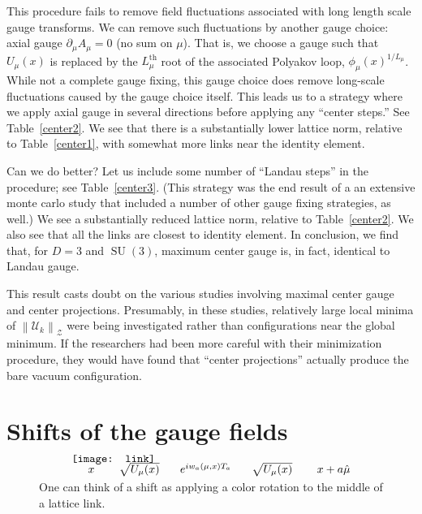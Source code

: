 \documentclass[preprint,aps,prd]{revtex4-2}
\newcommand{\zentrum}{\mathcal{Z}}       %
\newcommand{\config}{\mathcal{U}}
\DeclareMathOperator{\SU}{SU}
\begin{document}
This procedure fails to remove field fluctuations associated
with long length scale gauge transforms.  We can remove
such fluctuations by another gauge choice:  axial gauge
$\partial_\mu A_\mu = 0$ (no sum on $\mu$).
That is, we choose a gauge such that $U_\mu(x)$ is replaced
by the $L_\mu^\mathrm{th}$ root of the associated Polyakov loop,
$\phi_\mu(x)^{1/L_\mu}$.
While not a complete gauge fixing, this gauge choice does
remove long-scale fluctuations caused by the
gauge choice itself.
This leads us to a strategy where we apply axial gauge in several
directions before applying any ``center steps.'' See Table~\ref{center2}.
We see that there is a substantially lower lattice norm,
relative to Table~\ref{center1},
with somewhat more links near the identity element.

Can we do better? Let us include some number of ``Landau steps''
in the procedure; see Table~\ref{center3}.  (This strategy was
the end result of a an extensive monte carlo study that
included a number of other gauge fixing strategies, as well.)
We see a substantially reduced lattice norm, relative to
Table~\ref{center2}.  We also see that all the links are closest
to identity element.
In conclusion, we find that, for $D=3$ and $\SU(3)$,
maximum center gauge is, in fact, identical to Landau gauge.

This result casts doubt on the various studies involving maximal
center gauge and center projections.  Presumably,
in these studies, relatively large local minima of
$\left\lVert \config_k \right\rVert_\zentrum$ were being investigated
rather than configurations near the global minimum.
If the researchers had been more careful with their minimization
procedure, they would have found that ``center projections'' actually
produce the bare vacuum configuration.


\section{Shifts of the gauge fields}

\begin{figure}
  \[
  \begin{array}{l}
    \mbox{} \hspace{0.2in} x \hspace{0.3in} \sqrt{U_\mu(x)}
    \hspace{0.25in} e^{i w_{a}(\mu, x) T_a}
    \hspace{0.25in} \sqrt{U_\mu(x)} \hspace{0.3in} x+a\hat{\mu} \\[-0.3in]
  \texttt{[image: link]}
  \end{array}
  \]
  \caption{One can think of a shift as applying a color rotation
    to the middle of a lattice link. \label{shift}}
\end{figure}
\end{document}
